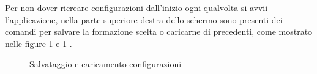\documentclass[hidelinks, 12pt]{article}
\begin{document}
\vspace{4ex}

Per non dover ricreare configurazioni dall'inizio ogni qualvolta si avvii l'applicazione, nella parte superiore destra dello schermo sono presenti dei comandi per salvare la formazione scelta o caricarne di precedenti, come mostrato nelle figure \ref{fig:config}  e \ref{fig:config} .

\begin{figure}[H]
	\centering
	\endminipage
	\hfill
	\endminipage
	\caption{Salvataggio e caricamento configurazioni}
	\label{fig:config}
\end{figure}
\end{document}
